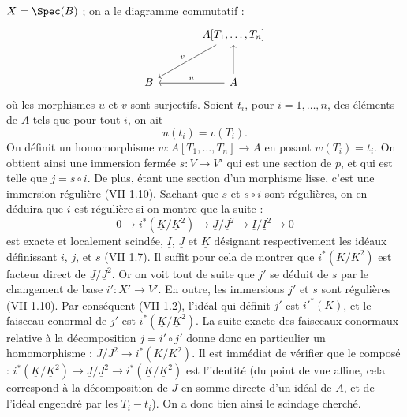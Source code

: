 
$X=\Spec(B)$ ; on a le diagramme commutatif :
\[
\begin{tikzcd}[column sep=large,row sep=large]
& A[T_1,\ldots,T_n] \arrow[dl,"v"']\\
B & A \arrow[l,"u"'] \arrow[u]
\end{tikzcd}
\]
où les morphismes $u$ et $v$ sont surjectifs. Soient $t_i$, pour $i=1,\ldots,n$, des éléments de $A$ tels que pour tout $i$, on ait
\[
u(t_i)=v(T_i).
\]
On définit un homomorphisme $w:A[T_1,\ldots,T_n]\longrightarrow A$ en posant $w(T_i)=t_i$. On obtient ainsi une immersion fermée $s:V\to V'$ qui est une section de $p$, et qui est telle que $j=s\circ i$. De plus, étant une section d'un morphisme lisse, c'est une immersion régulière (VII 1.10). Sachant que $s$ et $s\circ i$ sont régulières, on en déduira que $i$ est régulière si on montre que la suite :
\[
0\longrightarrow i^*(\underline{K}/\underline{K}^2)\longrightarrow \underline{J}/\underline{J}^2\longrightarrow \underline{I}/\underline{I}^2\longrightarrow0
\]
est exacte et localement scindée, $\underline{I}$, $\underline{J}$ et $\underline{K}$ désignant respectivement les idéaux définissant $i$, $j$, et $s$ (VII 1.7). Il suffit pour cela de montrer que $i^*(\underline{K}/\underline{K}^2)$ est facteur direct de $\underline{J}/\underline{J}^2$. Or on voit tout de suite que $j'$ se déduit de $s$ par le changement de base $i':X'\to V'$. En outre, les immersions $j'$ et $s$ sont régulières (VII 1.10). Par conséquent (VII 1.2), l'idéal qui définit $j'$ est $i'^*(\underline{K})$, et le faisceau conormal de $j'$ est $i^*(\underline{K}/\underline{K}^2)$. La suite exacte des faisceaux conormaux relative à la décomposition $j=i'\circ j'$ donne donc en particulier un homomorphisme : $\underline{J}/\underline{J}^2\longrightarrow i^*(\underline{K}/\underline{K}^2)$. Il est immédiat de vérifier que le composé : $i^*(\underline{K}/\underline{K}^2)\longrightarrow \underline{J}/\underline{J}^2\longrightarrow i^*(\underline{K}/\underline{K}^2)$ est l'identité (du point de vue affine, cela correspond à la décomposition de $J$ en somme directe d'un idéal de $A$, et de l'idéal engendré par les $T_i-t_i$). On a donc bien ainsi le scindage cherché.

